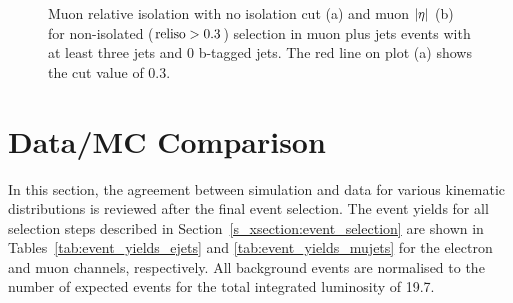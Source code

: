 \begin{figure}[!htbp]
	\centering
	\vspace*{-0.35cm}
  	\hfill
    \caption[Muon relative isolation with no isolation cut and muon $\abs \eta$ for non-isolated selection in muon plus
    jets events]{Muon relative isolation with no isolation cut (a) and muon $\abs \eta$ (b) for non-isolated ($\textrm{reliso} >
    0.3$) selection in muon plus jets events with at least three jets and 0 b-tagged jets. The red line on plot (a)
    shows the \reliso cut value of \num{0.3}.}
    \label{fig:qcd_muon_plots}
\end{figure}

\clearpage
\section{Data/MC Comparison}
\label{s_xsection:data_mc_comparison}

In this section, the agreement between simulation and data for various kinematic distributions is reviewed after the
final event selection. The event yields for all selection steps described in Section~\ref{s_xsection:event_selection}
are shown in Tables~\ref{tab:event_yields_ejets} and \ref{tab:event_yields_mujets} for the electron and muon channels,
respectively. All background events are normalised to the number of expected events for the total integrated luminosity
of \SI{19.7}{\fbinv}.


